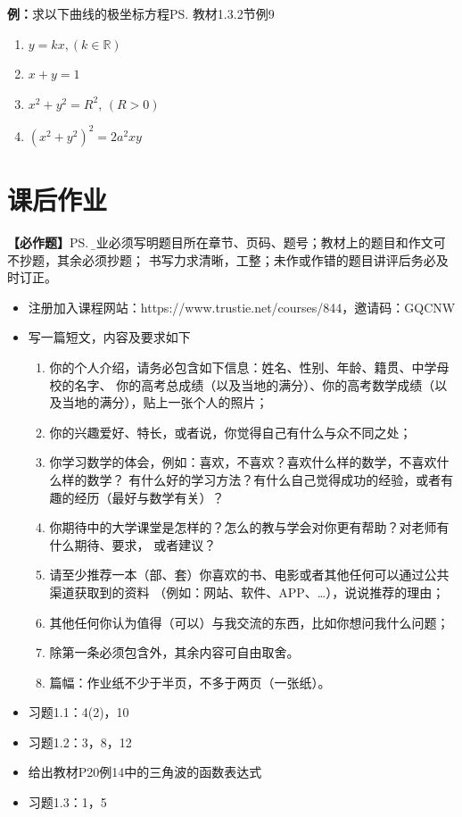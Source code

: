 {\bf 例：}求以下曲线的极坐标方程\ps{教材1.3.2节例9}
		
\begin{enumerate}[(1)]
  \setlength{\itemindent}{1cm}
  \item $y=kx,(k\in\mathbb{R})$
  \item $x+y=1$
  \item $x^2+y^2=R^2,\,(R>0)$
  \item $(x^2+y^2)^2=2a^2xy$
\end{enumerate}
	



\newpage

\section*{课后作业}

{\bf 【必作题】}\ps{\b 作业必须写明题目所在章节、页码、题号；教材上的题目和作文可不抄题，其余必须抄题；
书写力求清晰，工整；未作或作错的题目讲评后务必及时订正。}

\begin{itemize}
  \item 注册加入课程网站：https://www.trustie.net/courses/844，邀请码：GQCNW
  \item 写一篇短文，内容及要求如下
  \begin{enumerate}[(1)]
    \item 你的个人介绍，请务必包含如下信息：姓名、性别、年龄、籍贯、中学母校的名字、
    你的高考总成绩（以及当地的满分）、你的高考数学成绩（以及当地的满分），贴上一张个人的照片；
    \item 你的兴趣爱好、特长，或者说，你觉得自己有什么与众不同之处；
    \item 你学习数学的体会，例如：喜欢，不喜欢？喜欢什么样的数学，不喜欢什么样的数学？
    有什么好的学习方法？有什么自己觉得成功的经验，或者有趣的经历（最好与数学有关）？
    \item 你期待中的大学课堂是怎样的？怎么的教与学会对你更有帮助？对老师有什么期待、要求，
    或者建议？
    \item 请至少推荐一本（部、套）你喜欢的书、电影或者其他任何可以通过公共渠道获取到的资料
    （例如：网站、软件、APP、\ldots），说说推荐的理由；
    \item 其他任何你认为值得（可以）与我交流的东西，比如你想问我什么问题；
    \item 除第一条必须包含外，其余内容可自由取舍。
    \item 篇幅：作业纸不少于半页，不多于两页（一张纸）。
  \end{enumerate}
  \item 习题1.1：4(2)，10
%   
%   
%   
  \item 习题1.2：3，8，12
  \item 给出教材P20例14中的三角波的函数表达式
  \item 习题1.3：1，5
\end{itemize}

